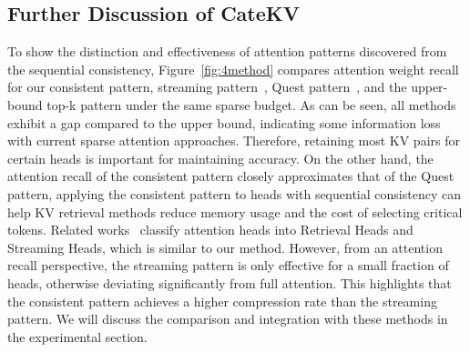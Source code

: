 

\subsection{Further Discussion of CateKV}
To show the distinction and effectiveness of attention patterns discovered from the sequential consistency, Figure~\ref{fig:4method} compares attention weight recall for our consistent pattern, streaming pattern~\cite{streamingllm}, Quest pattern~\cite{quest}, and the upper-bound top-k pattern under the same sparse budget. As can be seen, all methods exhibit a gap compared to the upper bound, indicating some information loss with current sparse attention approaches. Therefore, retaining most KV pairs for certain heads is important for maintaining accuracy. On the other hand, the attention recall of the consistent pattern closely approximates that of the Quest pattern, applying the consistent pattern to heads with sequential consistency can help KV retrieval methods reduce memory usage and the cost of selecting critical tokens. Related works~\cite{razorattention, duoattention} classify attention heads into Retrieval Heads and Streaming Heads, which is similar to our method. However, from an attention recall perspective, the streaming pattern is only effective for a small fraction of heads, otherwise deviating significantly from full attention. This highlights that the consistent pattern achieves a higher compression rate than the streaming pattern. We will discuss the comparison and integration with these methods in the experimental section.

